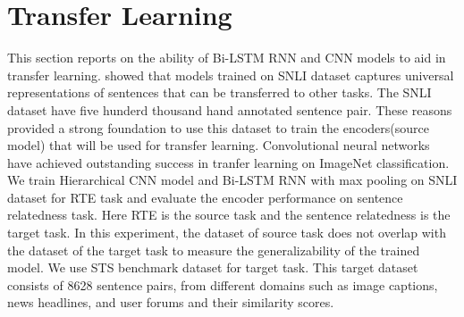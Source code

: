 \documentclass[12pt]{report} %
\begin{document}
\section{Transfer Learning}
\label{TL}

This section reports on the ability of Bi-LSTM RNN and CNN models to aid in transfer learning. \cite{conneau2017supervised} showed that models trained on SNLI dataset captures universal representations of sentences that can be transferred to other tasks. The SNLI dataset have five hunderd thousand hand annotated sentence pair. These reasons provided a strong foundation to use this dataset to train the encoders(source model) that will be used for transfer learning. Convolutional neural networks have achieved outstanding success in tranfer learning on ImageNet classification. We train Hierarchical CNN model and Bi-LSTM RNN with max pooling on SNLI dataset for RTE task and evaluate the encoder performance on sentence relatedness task. Here RTE is the source task and the sentence relatedness is the target task. In this experiment, the  dataset of source task does not overlap with the dataset of the target task to measure the generalizability of the trained model.  We use STS benchmark dataset \citep{cer2017semeval} for target task.  This target dataset consists of 8628 sentence pairs, from different domains such as image captions, news headlines, and user forums and their similarity scores.
\end{document}
